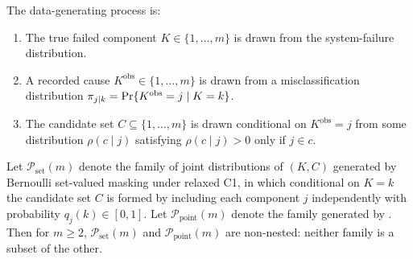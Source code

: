 \begin{definition}
\label{def:point-misclass}
The data-generating process is:
\begin{enumerate}
    \item The true failed component $K \in \{1, \ldots, m\}$ is drawn from
        the system-failure distribution.
    \item A recorded cause $K^{\mathrm{obs}} \in \{1, \ldots, m\}$ is drawn
        from a misclassification distribution
        $\pi_{j \mid k} = \mathrm{Pr}\{K^{\mathrm{obs}} = j \mid K = k\}$.
    \item The candidate set $C \subseteq \{1, \ldots, m\}$ is drawn
        conditional on $K^{\mathrm{obs}} = j$ from some distribution
        $\rho(c \mid j)$ satisfying $\rho(c \mid j) > 0$ only if $j \in c$.
\end{enumerate}
\end{definition}

\begin{lemma}
\label{lem:non-nesting}
Let $\mathcal{P}_{\mathrm{set}}(m)$ denote the family of joint distributions
of $(K, C)$ generated by Bernoulli set-valued masking under relaxed C1, in
which conditional on $K = k$ the candidate set $C$ is formed by including
each component $j$ independently with probability $q_j(k) \in [0, 1]$. Let
$\mathcal{P}_{\mathrm{point}}(m)$ denote the family generated by
. Then for $m \geq 2$,
$\mathcal{P}_{\mathrm{set}}(m)$ and $\mathcal{P}_{\mathrm{point}}(m)$ are
non-nested: neither family is a subset of the other.
\end{lemma}

